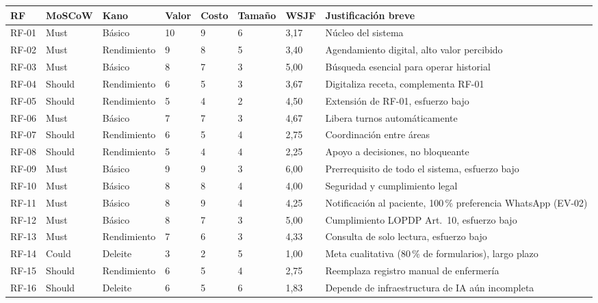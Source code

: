 \documentclass[11pt,a4paper]{article}
\begin{document}
	\begin{longtable}{p{} p{} p{} p{} p{} p{} p{} p{}}
		
		\toprule
		\textbf{RF} & \textbf{MoSCoW} & \textbf{Kano} & \textbf{Valor} & \textbf{Costo} & \textbf{Tamaño} & \textbf{WSJF} & \textbf{Justificación breve} \\
		\midrule
		\endhead
		
		
		RF-01 & Must    & Básico      & 10 & 9 & 6 & 3,17 & Núcleo del sistema \\
		RF-02 & Must    & Rendimiento & 9  & 8 & 5 & 3,40 & Agendamiento digital, alto valor percibido \\
		RF-03 & Must    & Básico      & 8  & 7 & 3 & 5,00 & Búsqueda esencial para operar historial \\
		RF-04 & Should  & Rendimiento & 6  & 5 & 3 & 3,67 & Digitaliza receta, complementa RF-01 \\
		RF-05 & Should  & Rendimiento & 5  & 4 & 2 & 4,50 & Extensión de RF-01, esfuerzo bajo \\
		RF-06 & Must    & Básico      & 7  & 7 & 3 & 4,67 & Libera turnos automáticamente \\
		RF-07 & Should  & Rendimiento & 6  & 5 & 4 & 2,75 & Coordinación entre áreas \\
		RF-08 & Should  & Rendimiento & 5  & 4 & 4 & 2,25 & Apoyo a decisiones, no bloqueante \\
		RF-09 & Must    & Básico      & 9  & 9 & 3 & 6,00 & Prerrequisito de todo el sistema, esfuerzo bajo \\
		RF-10 & Must    & Básico      & 8  & 8 & 4 & 4,00 & Seguridad y cumplimiento legal \\
		RF-11 & Must    & Básico      & 8  & 9 & 4 & 4,25 & Notificación al paciente, 100\,\% preferencia WhatsApp (EV-02) \\
		RF-12 & Must    & Básico      & 8  & 7 & 3 & 5,00 & Cumplimiento LOPDP Art.\ 10, esfuerzo bajo \\
		RF-13 & Must    & Rendimiento & 7  & 6 & 3 & 4,33 & Consulta de solo lectura, esfuerzo bajo \\
		RF-14 & Could   & Deleite     & 3  & 2 & 5 & 1,00 & Meta cualitativa (80\,\% de formularios), largo plazo \\
		RF-15 & Should  & Rendimiento & 6  & 5 & 4 & 2,75 & Reemplaza registro manual de enfermería \\
		RF-16 & Should  & Deleite     & 6  & 5 & 6 & 1,83 & Depende de infraestructura de IA aún incompleta \\

\end{longtable}
\end{document}
